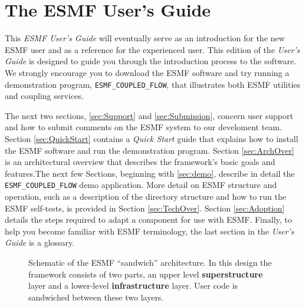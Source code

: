 \section{The ESMF User's Guide}

This {\it ESMF User's Guide} will eventually serve as an introduction for the 
new ESMF user and as a reference for the experienced user.
This edition of the {\it User's Guide} 
is designed to guide you through the introduction process
to the software.  We strongly encourage you
to download the ESMF software and try running a demonstration program, 
{\tt ESMF\_COUPLED\_FLOW}, that illustrates both ESMF utilities and coupling
services.

The next two sections, \ref{sec:Support} and \ref{sec:Submission}, concern 
user support and how to submit comments on the ESMF system to our develoment 
team.  Section \ref{sec:QuickStart} contains a {\it Quick Start} guide that 
explains how to install the ESMF software and 
run the demonstration program.  Section \ref{sec:ArchOver} is an 
architectural overview that describes the framework's basic goals and features.The next few Sections, beginning with \ref{sec:demo}, describe in detail
the {\tt ESMF\_COUPLED\_FLOW} demo application.    
More detail on ESMF structure and operation, such as a description of the 
directory structure and how to run the ESMF self-tests, is provided in Section 
\ref{sec:TechOver}.  Section \ref{sec:Adoption} details the steps 
required to adapt a component for use with ESMF.  Finally, to help you become 
familiar with ESMF terminology, the last section in the {\it User's Guide} is 
a glossary.  

\begin{center}
\begin{figure}
\caption{Schematic of the ESMF ``sandwich'' architecture. In this design the framework consists of two parts, an upper level
{\bf superstructure} layer and a lower-level {\bf infrastructure} layer. User code is sandwiched between these two layers.}
\label{fig:TheESMFwich}
\end{figure}
\end{center}
















